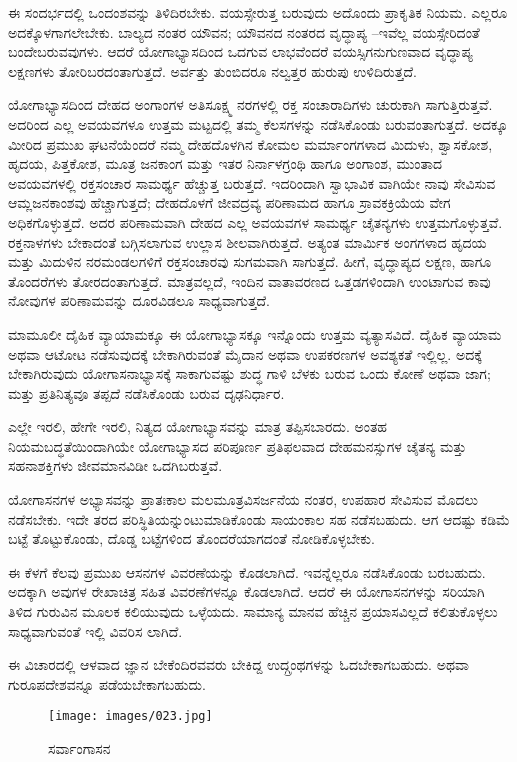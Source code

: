 ಈ ಸಂದರ್ಭದಲ್ಲಿ ಒಂದಂಶವನ್ನು ತಿಳಿದಿರಬೇಕು. ವಯಸ್ಸೇರುತ್ತ ಬರುವುದು ಅದೊಂದು ಪ್ರಾಕೃತಿಕ ನಿಯಮ. ಎಲ್ಲರೂ ಅದಕ್ಕೊಳಗಾಗಲೇಬೇಕು. ಬಾಲ್ಯದ ನಂತರ ಯೌವನ; ಯೌವನದ ನಂತರದ ವೃದ್ಧಾಪ್ಯ –ಇವೆಲ್ಲ ವಯಸ್ಸೇರಿದಂತೆ ಬಂದೇಬರುವವುಗಳು. ಆದರೆ ಯೋಗಾಭ್ಯಾಸದಿಂದ ಒದಗುವ ಲಾಭವೆಂದರೆ ವಯಸ್ಸಿಗನುಗುಣವಾದ ವೃದ್ಧಾಪ್ಯ ಲಕ್ಷಣಗಳು ತೋರಿಬರದಂತಾಗುತ್ತದೆ. ಅರ್ವತ್ತು ತುಂಬಿದರೂ ನಲ್ವತ್ತರ ಹುರುಪು ಉಳಿದಿರುತ್ತದೆ.

ಯೋಗಾಭ್ಯಾಸದಿಂದ ದೇಹದ ಅಂಗಾಂಗಳ ಅತಿಸೂಕ್ಷ್ಮ ನರಗಳಲ್ಲಿ ರಕ್ತ ಸಂಚಾರಾದಿಗಳು ಚುರುಕಾಗಿ ಸಾಗುತ್ತಿರುತ್ತವೆ. ಅದರಿಂದ ಎಲ್ಲ ಅವಯವಗಳೂ ಉತ್ತಮ ಮಟ್ಟದಲ್ಲಿ ತಮ್ಮ ಕೆಲಸಗಳನ್ನು ನಡೆಸಿಕೊಂಡು ಬರುವಂತಾಗುತ್ತದೆ. ಅದಕ್ಕೂ ಮೀರಿದ ಪ್ರಮುಖ ಘಟನೆಯೆಂದರೆ ನಮ್ಮ ದೇಹದೊಳಗಿನ ಕೋಮಲ ಮರ್ಮಾಂಗಗಳಾದ ಮಿದುಳು, ಶ್ವಾಸಕೋಶ, ಹೃದಯ, ಪಿತ್ತಕೋಶ, ಮೂತ್ರ ಜನಕಾಂಗ ಮತ್ತು ಇತರ ನಿರ್ನಾಳಗ್ರಂಥಿ ಹಾಗೂ ಅಂಗಾಂಶ, ಮುಂತಾದ ಅವಯವಗಳಲ್ಲಿ ರಕ್ತಸಂಚಾರ ಸಾಮರ್ಥ್ಯ ಹೆಚ್ಚುತ್ತ ಬರುತ್ತದೆ. ಇದರಿಂದಾಗಿ ಸ್ವಾಭಾವಿಕ ವಾಗಿಯೇ ನಾವು ಸೇವಿಸುವ ಆಮ್ಲಜನಕಾಂಶವು ಹೆಚ್ಚಾಗುತ್ತದೆ; ದೇಹದೊಳಗೆ ಜೀವದ್ರವ್ಯ ಪರಿಣಾಮದ ಹಾಗೂ ಸ್ರಾವಕಕ್ರಿಯೆಯ ವೇಗ ಅಧಿಕಗೊಳ್ಳುತ್ತದೆ. ಅದರ ಪರಿಣಾಮವಾಗಿ ದೇಹದ ಎಲ್ಲ ಅವಯವಗಳ ಸಾಮರ್ಥ್ಯ ಚೈತನ್ಯಗಳು ಉತ್ತಮಗೊಳ್ಳುತ್ತವೆ. ರಕ್ತನಾಳಗಳು ಬೇಕಾದಂತೆ ಬಗ್ಗಿಸಲಾಗುವ ಉಲ್ಲಾಸ ಶೀಲವಾಗಿರುತ್ತದೆ. ಅತ್ಯಂತ ಮಾರ್ಮಿಕ ಅಂಗಗಳಾದ ಹೃದಯ ಮತ್ತು ಮಿದುಳಿನ ನರಮಂಡಲಗಳಿಗೆ ರಕ್ತಸಂಚಾರವು ಸುಗಮವಾಗಿ ಸಾಗುತ್ತದೆ. ಹೀಗೆ, ವೃದ್ಧಾಪ್ಯದ ಲಕ್ಷಣ, ಹಾಗೂ ತೊಂದರೆಗಳು ತೋರದಂತಾಗುತ್ತದೆ. ಮಾತ್ರವಲ್ಲದೆ, ಇಂದಿನ ವಾತಾವರಣದ ಒತ್ತಡಗಳಿಂದಾಗಿ ಉಂಟಾಗುವ ಕಾವು ನೋವುಗಳ ಪರಿಣಾಮವನ್ನು ದೂರವಿಡಲೂ ಸಾಧ್ಯವಾಗುತ್ತದೆ.

ಮಾಮೂಲೀ ದೈಹಿಕ ವ್ಯಾಯಾಮಕ್ಕೂ ಈ ಯೋಗಾಭ್ಯಾಸಕ್ಕೂ ಇನ್ನೊಂದು ಉತ್ತಮ ವ್ಯತ್ಯಾಸವಿದೆ. ದೈಹಿಕ ವ್ಯಾಯಾಮ ಅಥವಾ ಆಟೋಟ ನಡೆಸುವುದಕ್ಕೆ ಬೇಕಾಗಿರುವಂತೆ ಮೈದಾನ ಅಥವಾ ಉಪಕರಣಗಳ ಅವಶ್ಯಕತೆ ಇಲ್ಲಿಲ್ಲ. ಅದಕ್ಕೆ ಬೇಕಾಗಿರುವುದು ಯೋಗಾಸನಾಭ್ಯಾಸಕ್ಕೆ ಸಾಕಾಗುವಷ್ಟು ಶುದ್ಧ ಗಾಳಿ ಬೆಳಕು ಬರುವ ಒಂದು ಕೋಣೆ ಅಥವಾ ಜಾಗ; ಮತ್ತು ಪ್ರತಿನಿತ್ಯವೂ ತಪ್ಪದೆ ನಡೆಸಿಕೊಂಡು ಬರುವ ದೃಢನಿರ್ಧಾರ.

ಎಲ್ಲೇ ಇರಲಿ, ಹೇಗೇ ಇರಲಿ, ನಿತ್ಯದ ಯೋಗಾಭ್ಯಾಸವನ್ನು ಮಾತ್ರ ತಪ್ಪಿಸಬಾರದು. ಅಂತಹ ನಿಯಮಬದ್ಧತೆಯಿಂದಾಗಿಯೇ ಯೋಗಾಭ್ಯಾಸದ ಪರಿಪೂರ್ಣ ಪ್ರತಿಫಲವಾದ ದೇಹಮನಸ್ಸುಗಳ ಚೈತನ್ಯ ಮತ್ತು ಸಹನಾಶಕ್ತಿಗಳು ಜೀವಮಾನವಿಡೀ ಒದಗಿಬರುತ್ತವೆ.

ಯೋಗಾಸನಗಳ ಅಭ್ಯಾಸವನ್ನು ಪ್ರಾತಃಕಾಲ ಮಲಮೂತ್ರವಿಸರ್ಜನೆಯ ನಂತರ, ಉಪಹಾರ ಸೇವಿಸುವ ಮೊದಲು ನಡೆಸಬೇಕು. ಇದೇ ತರದ ಪರಿಸ್ಥಿತಿಯನ್ನುಂಟುಮಾಡಿಕೊಂಡು ಸಾಯಂಕಾಲ ಸಹ ನಡೆಸಬಹುದು. ಆಗ ಆದಷ್ಟು ಕಡಿಮೆ ಬಟ್ಟೆ ತೊಟ್ಟುಕೊಂಡು, ದೊಡ್ಡ ಬಟ್ಟೆಗಳಿಂದ ತೊಂದರೆಯಾಗದಂತೆ ನೋಡಿಕೊಳ್ಳಬೇಕು.

ಈ ಕೆಳಗೆ ಕೆಲವು ಪ್ರಮುಖ ಆಸನಗಳ ವಿವರಣೆಯನ್ನು ಕೊಡಲಾಗಿದೆ. ಇವನ್ನೆಲ್ಲರೂ ನಡೆಸಿಕೊಂಡು ಬರಬಹುದು. ಅದಕ್ಕಾಗಿ ಅವುಗಳ ರೇಖಾಚಿತ್ರ ಸಹಿತ ವಿವರಣೆಗಳನ್ನೂ ಕೊಡಲಾಗಿದೆ. ಆದರೆ ಈ ಯೋಗಾಸನಗಳನ್ನು ಸರಿಯಾಗಿ ತಿಳಿದ ಗುರುವಿನ ಮೂಲಕ ಕಲಿಯುವುದು ಒಳ್ಳೆಯದು. ಸಾಮಾನ್ಯ ಮಾನವ ಹೆಚ್ಚಿನ ಪ್ರಯಾಸವಿಲ್ಲದೆ ಕಲಿತುಕೊಳ್ಳಲು ಸಾಧ್ಯವಾಗುವಂತೆ ಇಲ್ಲಿ ವಿವರಿಸ ಲಾಗಿದೆ.

ಈ ವಿಚಾರದಲ್ಲಿ ಆಳವಾದ ಜ್ಞಾನ ಬೇಕೆಂದಿರವವರು ಬೇಕಿದ್ದ ಉದ್ಗ್ರಂಥಗಳನ್ನು ಓದಬೇಕಾಗಬಹುದು. ಅಥವಾ ಗುರೂಪದೇಶವನ್ನೂ ಪಡೆಯಬೇಕಾಗಬಹುದು.

\begin{figure}
\texttt{[image: images/023.jpg]}
\caption{ಸರ್ವಾಂಗಾಸನ }
\end{figure}

